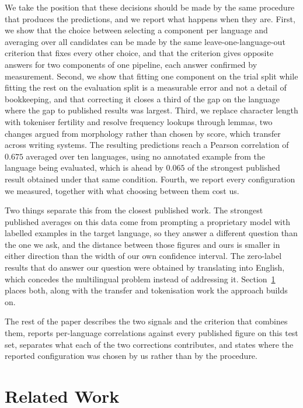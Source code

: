 We take the position that these decisions should be made by the same
procedure that produces the predictions, and we report what happens when
they are. First, we show that the choice between selecting a component
per language and averaging over all candidates can be made by the same
leave-one-language-out criterion that fixes every other choice, and that
the criterion gives opposite answers for two components of one pipeline,
each answer confirmed by measurement. Second, we show that fitting one
component on the trial split while fitting the rest on the evaluation
split is a measurable error and not a detail of bookkeeping, and that
correcting it closes a third of the gap on the language where the gap to
published results was largest. Third, we replace character length with
tokeniser fertility and resolve frequency lookups through lemmas, two
changes argued from morphology rather than chosen by score, which
transfer across writing systems. The resulting predictions reach a
Pearson correlation of $0.675$ averaged over ten languages, using no annotated
example from the language being evaluated, which is ahead by $0.065$ of
the strongest published result obtained under that same condition.
Fourth, we report every configuration we measured, together with what
choosing between them cost us.

Two things separate this from the closest published work. The strongest
published averages on this data come from prompting a proprietary model
with labelled examples in the target language, so they answer a
different question than the one we ask, and the distance between those
figures and ours is smaller in either direction than the width of our
own confidence interval.
The zero-label results that do answer our question were obtained by
translating into English, which concedes the multilingual problem
instead of addressing it. Section~\ref{sec:related} places both, along
with the transfer and tokenisation work the approach builds on.

The rest of the paper describes the two signals and the criterion that
combines them, reports per-language correlations against every published
figure on this test set, separates what each of the two corrections
contributes, and states where the reported configuration was chosen by
us rather than by the procedure.

\section{Related Work}
\label{sec:related}

